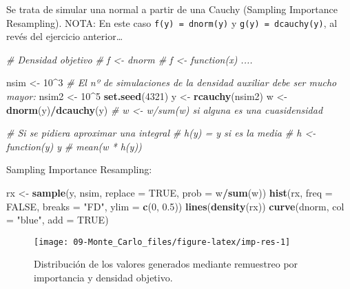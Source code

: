 \documentclass[
]{book}
\newenvironment{Shaded}{\begin{snugshade}}{\end{snugshade}}
\newcommand{\CommentTok}[1]{\textcolor[rgb]{0.56,0.35,0.01}{\textit{#1}}}
\newcommand{\DataTypeTok}[1]{\textcolor[rgb]{0.13,0.29,0.53}{#1}}
\newcommand{\DecValTok}[1]{\textcolor[rgb]{0.00,0.00,0.81}{#1}}
\newcommand{\FloatTok}[1]{\textcolor[rgb]{0.00,0.00,0.81}{#1}}
\newcommand{\KeywordTok}[1]{\textcolor[rgb]{0.13,0.29,0.53}{\textbf{#1}}}
\newcommand{\NormalTok}[1]{#1}
\newcommand{\OperatorTok}[1]{\textcolor[rgb]{0.81,0.36,0.00}{\textbf{#1}}}
\newcommand{\OtherTok}[1]{\textcolor[rgb]{0.56,0.35,0.01}{#1}}
\newcommand{\StringTok}[1]{\textcolor[rgb]{0.31,0.60,0.02}{#1}}
\theoremstyle{break}
\theoremstyle{definition}
\theoremstyle{definition}
\theoremstyle{definition}
\theoremstyle{remark}
\begin{document}
Se trata de simular una normal a partir de una Cauchy (Sampling Importance Resampling).
NOTA: En este caso \texttt{f(y)\ =\ dnorm(y)} y \texttt{g(y)\ =\ dcauchy(y)}, al revés del ejercicio anterior\ldots{}

\begin{Shaded}
\begin{Highlighting}[]
\CommentTok{# Densidad objetivo}
\CommentTok{# f <- dnorm # f <- function(x) ....}

\NormalTok{nsim <-}\StringTok{ }\DecValTok{10}\OperatorTok{^}\DecValTok{3}
\CommentTok{# El nº de simulaciones de la densidad auxiliar debe ser mucho mayor:}
\NormalTok{nsim2 <-}\StringTok{ }\DecValTok{10}\OperatorTok{^}\DecValTok{5}
\KeywordTok{set.seed}\NormalTok{(}\DecValTok{4321}\NormalTok{)}
\NormalTok{y <-}\StringTok{ }\KeywordTok{rcauchy}\NormalTok{(nsim2)}
\NormalTok{w <-}\StringTok{ }\KeywordTok{dnorm}\NormalTok{(y)}\OperatorTok{/}\KeywordTok{dcauchy}\NormalTok{(y) }\CommentTok{# w <- w/sum(w) si alguna es una cuasidensidad}

\CommentTok{# Si se pidiera aproximar una integral}
\CommentTok{# h(y) = y si es la media # h <- function(y) y}
\CommentTok{# mean(w * h(y))}
\end{Highlighting}
\end{Shaded}

Sampling Importance Resampling:

\begin{Shaded}
\begin{Highlighting}[]
\NormalTok{rx <-}\StringTok{ }\KeywordTok{sample}\NormalTok{(y, nsim, }\DataTypeTok{replace =} \OtherTok{TRUE}\NormalTok{, }\DataTypeTok{prob =}\NormalTok{ w}\OperatorTok{/}\KeywordTok{sum}\NormalTok{(w))}
\KeywordTok{hist}\NormalTok{(rx, }\DataTypeTok{freq =} \OtherTok{FALSE}\NormalTok{, }\DataTypeTok{breaks =} \StringTok{"FD"}\NormalTok{, }\DataTypeTok{ylim =} \KeywordTok{c}\NormalTok{(}\DecValTok{0}\NormalTok{, }\FloatTok{0.5}\NormalTok{))}
\KeywordTok{lines}\NormalTok{(}\KeywordTok{density}\NormalTok{(rx))}
\KeywordTok{curve}\NormalTok{(dnorm, }\DataTypeTok{col =} \StringTok{"blue"}\NormalTok{, }\DataTypeTok{add =} \OtherTok{TRUE}\NormalTok{)}
\end{Highlighting}
\end{Shaded}

\begin{figure}[!htb]

{\centering \texttt{[image: 09-Monte\_Carlo\_files/figure-latex/imp-res-1]} 

}

\caption{Distribución de los valores generados mediante remuestreo por importancia y densidad objetivo.}\label{fig:imp-res}
\end{figure}
\end{document}
